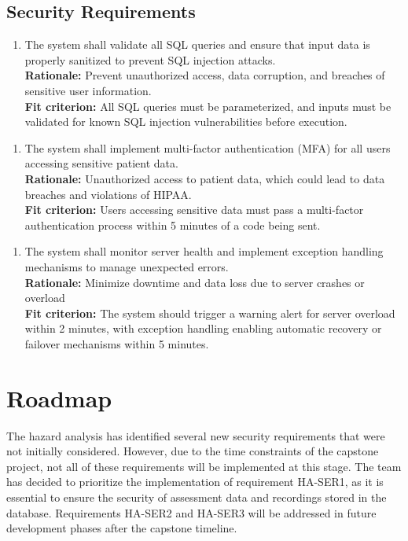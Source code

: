 \documentclass{article}
\begin{document}
\subsection{Security Requirements}
\begin{enumerate}[{HA-SER}1. ]
    \item The system shall validate all SQL queries and ensure that input data is properly sanitized to prevent SQL injection attacks.\\
    \textbf{Rationale: }Prevent unauthorized access, data corruption, and breaches of sensitive user information.\\
    \textbf{Fit criterion: }All SQL queries must be parameterized, and inputs must be validated for known SQL injection vulnerabilities before execution.\\ 
  \end{enumerate}
\begin{enumerate}[{HA-SER}2. ]
    \item The system shall implement multi-factor authentication (MFA) for all users accessing sensitive patient data.\\
    \textbf{Rationale: }Unauthorized access to patient data, which could lead to data breaches and violations of HIPAA.\\
    \textbf{Fit criterion: }Users accessing sensitive data must pass a multi-factor authentication process within 5 minutes of a code being sent.\\
  \end{enumerate}
\begin{enumerate}[{HA-SER}3. ]
    \item The system shall monitor server health and implement exception handling mechanisms to manage unexpected errors.\\
    \textbf{Rationale: }Minimize downtime and data loss due to server crashes or overload\\
    \textbf{Fit criterion: }The system should trigger a warning alert for server overload within 2 minutes, with exception handling enabling automatic recovery or failover mechanisms within 5 minutes.\\
  \end{enumerate}
\section{Roadmap}
\hspace{1.5em} The hazard analysis has identified several new security requirements that were 
not initially considered. However, due to the time constraints of the capstone 
project, not all of these requirements will be implemented at this stage. The 
team has decided to prioritize the implementation of requirement HA-SER1, as it
is essential to ensure the security of assessment data and recordings stored in the database. Requirements HA-SER2 and
HA-SER3 will be addressed in future development phases after the capstone timeline.
\newpage
\end{document}
